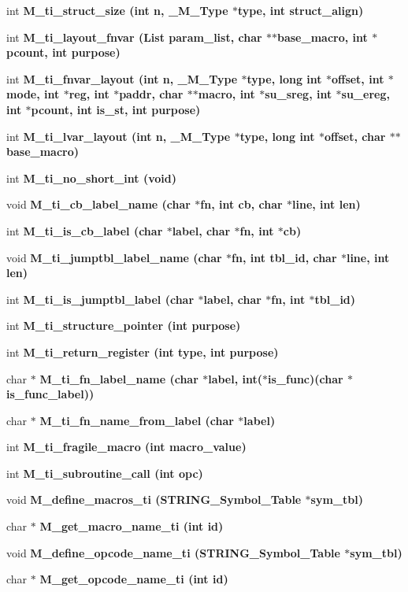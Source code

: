 \begin{CompactItemize}
\item 
int \bf{M\_\-ti\_\-struct\_\-size} (int n, \bf{\_\-M\_\-Type} $\ast$type, int struct\_\-align)
\item 
int \bf{M\_\-ti\_\-layout\_\-fnvar} (\bf{List} param\_\-list, char $\ast$$\ast$base\_\-macro, int $\ast$pcount, int purpose)
\item 
int \bf{M\_\-ti\_\-fnvar\_\-layout} (int n, \bf{\_\-M\_\-Type} $\ast$type, long int $\ast$offset, int $\ast$\bf{mode}, int $\ast$reg, int $\ast$paddr, char $\ast$$\ast$macro, int $\ast$su\_\-sreg, int $\ast$su\_\-ereg, int $\ast$pcount, int is\_\-st, int purpose)
\item 
int \bf{M\_\-ti\_\-lvar\_\-layout} (int n, \bf{\_\-M\_\-Type} $\ast$type, long int $\ast$offset, char $\ast$$\ast$base\_\-macro)
\item 
int \bf{M\_\-ti\_\-no\_\-short\_\-int} (void)
\item 
void \bf{M\_\-ti\_\-cb\_\-label\_\-name} (char $\ast$fn, int cb, char $\ast$line, int len)
\item 
int \bf{M\_\-ti\_\-is\_\-cb\_\-label} (char $\ast$label, char $\ast$fn, int $\ast$cb)
\item 
void \bf{M\_\-ti\_\-jumptbl\_\-label\_\-name} (char $\ast$fn, int tbl\_\-id, char $\ast$line, int len)
\item 
int \bf{M\_\-ti\_\-is\_\-jumptbl\_\-label} (char $\ast$label, char $\ast$fn, int $\ast$tbl\_\-id)
\item 
int \bf{M\_\-ti\_\-structure\_\-pointer} (int purpose)
\item 
int \bf{M\_\-ti\_\-return\_\-register} (int type, int purpose)
\item 
char $\ast$ \bf{M\_\-ti\_\-fn\_\-label\_\-name} (char $\ast$label, int($\ast$is\_\-func)(char $\ast$is\_\-func\_\-label))
\item 
char $\ast$ \bf{M\_\-ti\_\-fn\_\-name\_\-from\_\-label} (char $\ast$label)
\item 
int \bf{M\_\-ti\_\-fragile\_\-macro} (int macro\_\-value)
\item 
int \bf{M\_\-ti\_\-subroutine\_\-call} (int opc)
\item 
void \bf{M\_\-define\_\-macros\_\-ti} (\bf{STRING\_\-Symbol\_\-Table} $\ast$sym\_\-tbl)
\item 
char $\ast$ \bf{M\_\-get\_\-macro\_\-name\_\-ti} (int id)
\item 
void \bf{M\_\-define\_\-opcode\_\-name\_\-ti} (\bf{STRING\_\-Symbol\_\-Table} $\ast$sym\_\-tbl)
\item 
char $\ast$ \bf{M\_\-get\_\-opcode\_\-name\_\-ti} (int id)
$$
\end{CompactItemize}
